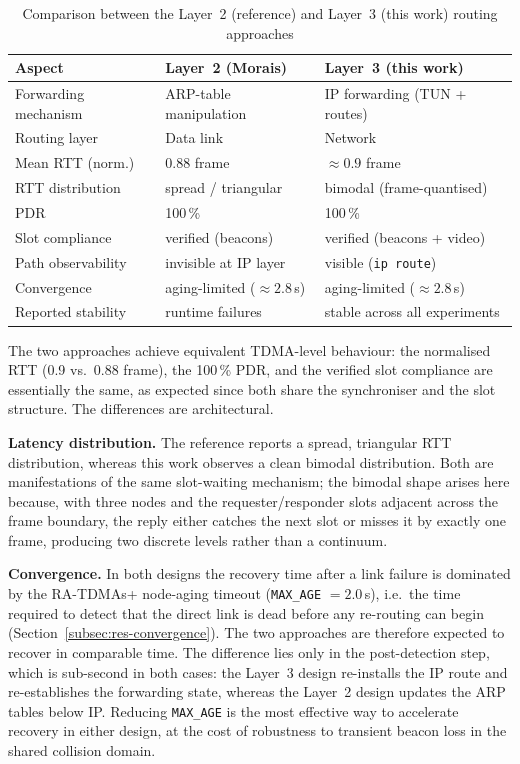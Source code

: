 \begin{table}[h]
\centering
\caption{Comparison between the Layer~2 (reference) and Layer~3 (this work)
routing approaches}
\label{tab:comparison}
\begin{tabular}{lll}
\toprule
\textbf{Aspect} & \textbf{Layer~2 (Morais)} & \textbf{Layer~3 (this work)} \\
\midrule
Forwarding mechanism & ARP-table manipulation & IP forwarding (TUN + routes) \\
Routing layer        & Data link             & Network \\
Mean RTT (norm.)     & 0.88 frame            & $\approx 0.9$ frame \\
RTT distribution     & spread / triangular   & bimodal (frame-quantised) \\
PDR                  & 100\,\%               & 100\,\% \\
Slot compliance      & verified (beacons)    & verified (beacons + video) \\
Path observability   & invisible at IP layer & visible (\texttt{ip route}) \\
Convergence          & aging-limited ($\approx 2.8$\,s) & aging-limited ($\approx 2.8$\,s) \\
Reported stability   & runtime failures      & stable across all experiments \\
\bottomrule
\end{tabular}
\end{table}

The two approaches achieve equivalent TDMA-level behaviour: the normalised RTT
(0.9 vs.\ 0.88 frame), the 100\,\% PDR, and the verified slot compliance are
essentially the same, as expected since both share the synchroniser and the
slot structure. The differences are architectural.

\textbf{Latency distribution.} The reference reports a spread, triangular RTT
distribution, whereas this work observes a clean bimodal distribution. Both
are manifestations of the same slot-waiting mechanism; the bimodal shape
arises here because, with three nodes and the requester/responder slots
adjacent across the frame boundary, the reply either catches the next slot or
misses it by exactly one frame, producing two discrete levels rather than a
continuum.

\textbf{Convergence.} In both designs the recovery time after a link failure is
dominated by the RA-TDMAs+ node-aging timeout (\texttt{MAX\_AGE} $= 2.0$\,s),
i.e.\ the time required to detect that the direct link is dead before any
re-routing can begin (Section~\ref{subsec:res-convergence}). The two approaches
are therefore expected to recover in comparable time. The difference lies only
in the post-detection step, which is sub-second in both cases: the Layer~3
design re-installs the IP route and re-establishes the forwarding state,
whereas the Layer~2 design updates the ARP tables below IP. Reducing
\texttt{MAX\_AGE} is the most effective way to accelerate recovery in either
design, at the cost of robustness to transient beacon loss in the shared
collision domain.

